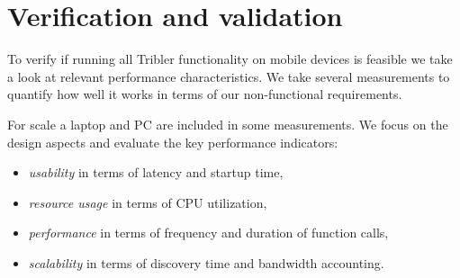 \chapter{Verification and validation}
\label{ch:results}

To verify if running all Tribler functionality on mobile devices is feasible we take a look at relevant performance characteristics.
We take several measurements to quantify how well it works in terms of our non-functional requirements.

For scale a laptop and PC are included in some measurements.
We focus on the design aspects and evaluate the key performance indicators:
\begin{itemize}
	\item{\emph{usability} in terms of latency and startup time,}
	\item{\emph{resource usage} in terms of CPU utilization,}
	\item{\emph{performance} in terms of frequency and duration of function calls,}
	\item{\emph{scalability} in terms of discovery time and bandwidth accounting.}
\end{itemize}


